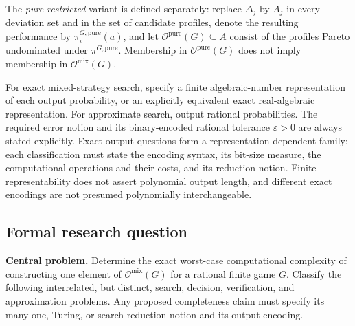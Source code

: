 \documentclass[11pt,a4paper]{article}
\begin{document}
The \emph{pure-restricted} variant is defined separately: replace $\Delta_j$ by $A_j$ in every deviation set and in the set of candidate profiles, denote the resulting performance by $\pi_i^{G,\mathrm{pure}}(a)$, and let $\mathcal O^{\mathrm{pure}}(G)\subseteq A$ consist of the profiles Pareto undominated under $\pi^{G,\mathrm{pure}}$. Membership in $\mathcal O^{\mathrm{pure}}(G)$ does not imply membership in $\mathcal O^{\mathrm{mix}}(G)$.

For exact mixed-strategy search, specify a finite algebraic-number representation of each output probability, or an explicitly equivalent exact real-algebraic representation. For approximate search, output rational probabilities. The required error notion and its binary-encoded rational tolerance $\varepsilon>0$ are always stated explicitly. Exact-output questions form a representation-dependent family: each classification must state the encoding syntax, its bit-size measure, the computational operations and their costs, and its reduction notion. Finite representability does not assert polynomial output length, and different exact encodings are not presumed polynomially interchangeable.

\subsection*{Formal research question}

\textbf{Central problem.} Determine the exact worst-case computational complexity of constructing one element of $\mathcal O^{\mathrm{mix}}(G)$ for a rational finite game $G$. Classify the following interrelated, but distinct, search, decision, verification, and approximation problems. Any proposed completeness claim must specify its many-one, Turing, or search-reduction notion and its output encoding.
\end{document}
